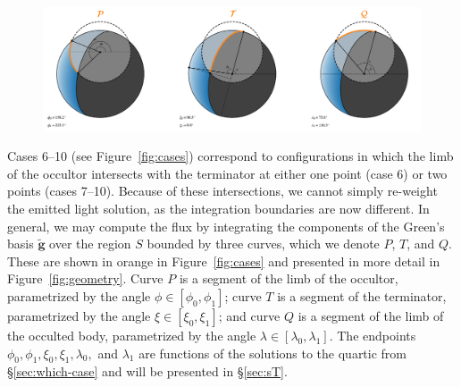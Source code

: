 \documentclass[modern]{aastex62}
\newcommand{\BF}[1]{\ensuremath{\mathbf{#1}}}
\newcommand{\bg}{\ensuremath{\tilde{\BF{g}}}}
\begin{document}
\begin{figure}[t!]
    \begin{centering}
        \includegraphics[width=\linewidth]{figures/geometry.pdf}
    \end{centering}
\end{figure}

Cases 6--10 (see Figure~\ref{fig:cases}) correspond to configurations in which
the limb of the occultor intersects with the terminator at either one point
(case 6) or two points (cases 7--10). Because of these intersections, we
cannot simply re-weight the emitted light solution, as the integration
boundaries are now different. In general, we may compute the flux by
integrating the components of the Green's basis $\bg$
over the region $S$ bounded by three curves, which we denote
$P$, $T$, and $Q$. These are shown in orange
in Figure~\ref{fig:cases} and presented in more detail in
Figure~\ref{fig:geometry}.
Curve $P$ is a segment of the limb of
the occultor, parametrized by the angle $\phi \in [\phi_0, \phi_1]$;
curve $T$ is a segment of the terminator,
parametrized by the angle $\xi \in [\xi_0, \xi_1]$;
and curve $Q$ is a segment of the limb of the occulted body,
parametrized by the angle $\lambda \in [\lambda_0, \lambda_1]$.
The endpoints $\phi_0, \phi_1, \xi_0, \xi_1, \lambda_0,$ and
$\lambda_1$ are functions of the solutions to the quartic from
\S\ref{sec:which-case} and will be presented in \S\ref{sec:sT}.
\end{document}
